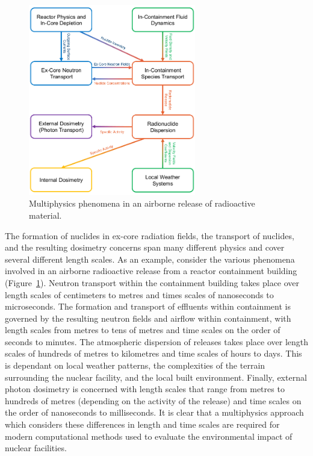 \begin{figure}[H]
    \centering
    \includegraphics[width=0.65\textwidth]{images/introduction/release_multiphysics.png}
    \caption{Multiphysics phenomena in an airborne release of radioactive material.}
    \label{fig:introduction:ms:physics}
\end{figure}

The formation of nuclides in ex-core radiation fields, the transport of nuclides, and the resulting dosimetry concerns span many different physics and cover several different length scales. As an example, consider the various phenomena involved in an airborne radioactive release from a reactor containment building (Figure~\ref{fig:introduction:ms:physics}). Neutron transport within the containment building takes place over length scales of centimeters to metres and times scales of nanoseconds to microseconds. The formation and transport of effluents within containment is governed by the resulting neutron fields and airflow within containment, with length scales from metres to tens of metres and time scales on the order of seconds to minutes. The atmospheric dispersion of releases takes place over length scales of hundreds of metres to kilometres and time scales of hours to days. This is dependant on local weather patterns, the complexities of the terrain surrounding the nuclear facility, and the local built environment. Finally, external photon dosimetry is concerned with length scales that range from metres to hundreds of metres (depending on the activity of the release) and time scales on the order of nanoseconds to milliseconds. It is clear that a multiphysics approach which considers these differences in length and time scales are required for modern computational methods used to evaluate the environmental impact of nuclear facilities.

